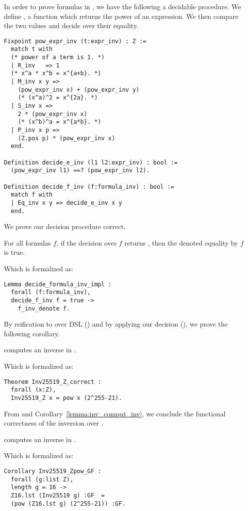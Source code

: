 In order to prove formulas in ,
we have the following a decidable procedure.
We define , a function which returns the power of an expression.
We then compare the two values and decide over their equality.
\begin{lstlisting}[language=Coq]
Fixpoint pow_expr_inv (t:expr_inv) : Z :=
  match t with
  (* power of a term is 1. *)
  | R_inv   => 1
  (* x^a * x^b = x^{a+b}. *)
  | M_inv x y =>
    (pow_expr_inv x) + (pow_expr_inv y)
    (* (x^a)^2 = x^{2a}. *)
  | S_inv x =>
    2 * (pow_expr_inv x)
    (* (x^b)^a = x^{a*b}. *)
  | P_inv x p =>
    (Z.pos p) * (pow_expr_inv x)
  end.

Definition decide_e_inv (l1 l2:expr_inv) : bool :=
  (pow_expr_inv l1) ==? (pow_expr_inv l2).

Definition decide_f_inv (f:formula_inv) : bool :=
  match f with
  | Eq_inv x y => decide_e_inv x y
  end.
\end{lstlisting}

We prove our decision procedure correct.
\begin{lemma}
\label{lemma:decide}
For all formulas $f$, if the decision over $f$ returns ,
then the denoted equality by $f$ is true.
\end{lemma}
Which is formalized as:
\begin{lstlisting}[language=Coq]
Lemma decide_formula_inv_impl :
  forall (f:formula_inv),
  decide_f_inv f = true ->
    f_inv_denote f.
\end{lstlisting}

By reification to over DSL () and by applying our decision
(), we prove the following corollary.
\begin{lemma}
\label{lemma:inv_comput_inv}
 computes an inverse in \Zfield.
\end{lemma}
Which is formalized as:
\begin{lstlisting}[language=Coq]
Theorem Inv25519_Z_correct :
  forall (x:Z),
  Inv25519_Z x = pow x (2^255-21).
\end{lstlisting}

From  and Corollary~\ref{lemma:inv_comput_inv},
we conclude the functional correctness of the inversion over \Zfield.
\begin{corollary}
\label{cor:inv_comput_field}
 computes an inverse in \Zfield.
\end{corollary}
Which is formalized as:
\begin{lstlisting}[language=Coq]
Corollary Inv25519_Zpow_GF :
  forall (g:list Z),
  length g = 16 ->
  Z16.lst (Inv25519 g) :GF  =
  (pow (Z16.lst g) (2^255-21)) :GF.
\end{lstlisting}

